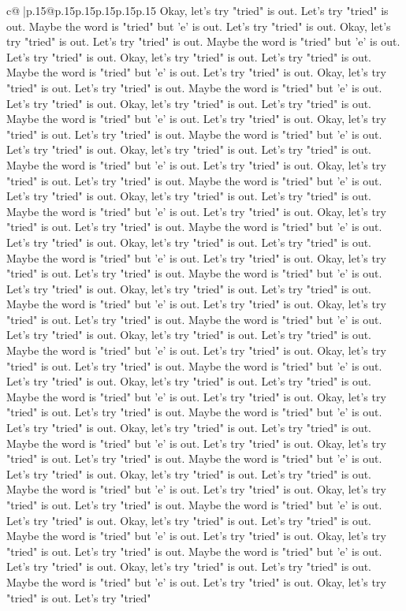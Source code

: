 \documentclass{article}
\begin{document}
{\begin{supertabular}{c@{$\;$}|p{.15\linewidth}@{}p{.15\linewidth}p{.15\linewidth}p{.15\linewidth}p{.15\linewidth}p{.15\linewidth}}
{{{Okay, let's try "tried" is out. Let's try "tried" is out. Maybe the word is "tried" but 'e' is out. Let's try "tried" is out. Okay, let's try "tried" is out. Let's try "tried" is out. Maybe the word is "tried" but 'e' is out. Let's try "tried" is out. Okay, let's try "tried" is out. Let's try "tried" is out. Maybe the word is "tried" but 'e' is out. Let's try "tried" is out. Okay, let's try "tried" is out. Let's try "tried" is out. Maybe the word is "tried" but 'e' is out. Let's try "tried" is out. Okay, let's try "tried" is out. Let's try "tried" is out. Maybe the word is "tried" but 'e' is out. Let's try "tried" is out. Okay, let's try "tried" is out. Let's try "tried" is out. Maybe the word is "tried" but 'e' is out. Let's try "tried" is out. Okay, let's try "tried" is out. Let's try "tried" is out. Maybe the word is "tried" but 'e' is out. Let's try "tried" is out. Okay, let's try "tried" is out. Let's try "tried" is out. Maybe the word is "tried" but 'e' is out. Let's try "tried" is out. Okay, let's try "tried" is out. Let's try "tried" is out. Maybe the word is "tried" but 'e' is out. Let's try "tried" is out. Okay, let's try "tried" is out. Let's try "tried" is out. Maybe the word is "tried" but 'e' is out. Let's try "tried" is out. Okay, let's try "tried" is out. Let's try "tried" is out. Maybe the word is "tried" but 'e' is out. Let's try "tried" is out. Okay, let's try "tried" is out. Let's try "tried" is out. Maybe the word is "tried" but 'e' is out. Let's try "tried" is out. Okay, let's try "tried" is out. Let's try "tried" is out. Maybe the word is "tried" but 'e' is out. Let's try "tried" is out. Okay, let's try "tried" is out. Let's try "tried" is out. Maybe the word is "tried" but 'e' is out. Let's try "tried" is out. Okay, let's try "tried" is out. Let's try "tried" is out. Maybe the word is "tried" but 'e' is out. Let's try "tried" is out. Okay, let's try "tried" is out. Let's try "tried" is out. Maybe the word is "tried" but 'e' is out. Let's try "tried" is out. Okay, let's try "tried" is out. Let's try "tried" is out. Maybe the word is "tried" but 'e' is out. Let's try "tried" is out. Okay, let's try "tried" is out. Let's try "tried" is out. Maybe the word is "tried" but 'e' is out. Let's try "tried" is out. Okay, let's try "tried" is out. Let's try "tried" is out. Maybe the word is "tried" but 'e' is out. Let's try "tried" is out. Okay, let's try "tried" is out. Let's try "tried" is out. Maybe the word is "tried" but 'e' is out. Let's try "tried" is out. Okay, let's try "tried" is out. Let's try "tried" is out. Maybe the word is "tried" but 'e' is out. Let's try "tried" is out. Okay, let's try "tried" is out. Let's try "tried" is out. Maybe the word is "tried" but 'e' is out. Let's try "tried" is out. Okay, let's try "tried" is out. Let's try "tried" is out. Maybe the word is "tried" but 'e' is out. Let's try "tried" is out. Okay, let's try "tried" is out. Let's try "tried" is out. Maybe the word is "tried" but 'e' is out. Let's try "tried" is out. Okay, let's try "tried" is out. Let's try "tried" is out. Maybe the word is "tried" but 'e' is out. Let's try "tried" is out. Okay, let's try "tried" is out. Let's try "tried" }}}
\end{supertabular}}
\end{document}
